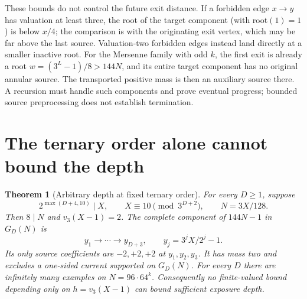 \documentclass[11pt]{article}
\newtheorem{theorem}{Theorem}
\begin{document}
These bounds do not control the future exit distance. If a forbidden
edge $x\to y$ has valuation at least three, the root of the target
component (with root$(1)=1$) is below $x/4$; the comparison is with the originating exit
vertex, which may be far above the last source. Valuation-two forbidden
edges instead land directly at a smaller inactive root.
For the Mersenne family with odd $k$, the first exit is already a root
$w=(3^L-1)/8>144N$, and its entire target component has no original
annular source. The transported positive mass is then an auxiliary
source there. A recursion must handle such components and prove eventual
progress; bounded source preprocessing does not establish termination.

\section{The ternary order alone cannot bound the depth}
\begin{theorem}[Arbitrary depth at fixed ternary order]\label{thm:fixedh}
For every $D\ge1$, suppose
\[
2^{\max(D+4,10)}\mid X,\qquad X\equiv10\pmod{3^{D+2}},
\qquad N=3X/128.
\]
Then $8\mid N$ and $v_3(X-1)=2$. The complete component of $144N-1$
in $G_D(N)$ is
\[
y_1\longrightarrow\cdots\longrightarrow y_{D+3},
\qquad y_j=3^jX/2^j-1.
\]
Its only source coefficients are $-2,+2,+2$ at $y_1,y_2,y_3$.
It has mass two and excludes a one-sided current supported on $G_D(N)$.
For every $D$ there are infinitely many examples on $N=96\cdot64^k$.
Consequently no finite-valued bound depending only on $h=v_3(X-1)$
can bound sufficient exposure depth.
\end{theorem}
\end{document}
